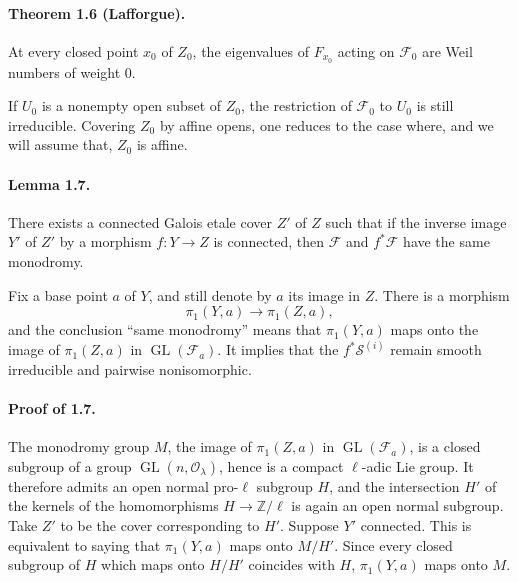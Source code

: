 \documentclass[10pt]{article}
\newcommand{\Z}{\mathbb{Z}}
\newcommand{\GL}{\operatorname{GL}}
\begin{document}
\paragraph{Theorem 1.6 (Lafforgue).}
At every closed point $x_0$ of $Z_0$, the eigenvalues of $F_{x_0}$ acting on $\mathcal F_0$ are Weil numbers of weight $0$.

If $U_0$ is a nonempty open subset of $Z_0$, the restriction of $\mathcal F_0$ to $U_0$ is still irreducible.
Covering $Z_0$ by affine opens, one reduces to the case where, and we will assume that, $Z_0$ is affine.

\paragraph{Lemma 1.7.}
There exists a connected Galois etale cover $Z'$ of $Z$ such that if the inverse image $Y'$ of $Z'$ by a morphism $f:Y\to Z$ is connected, then $\mathcal F$ and $f^*\mathcal F$ have the same monodromy.

Fix a base point $a$ of $Y$, and still denote by $a$ its image in $Z$.
There is a morphism
\[
 \pi_1(Y,a)\longrightarrow\pi_1(Z,a),
\]
and the conclusion ``same monodromy'' means that $\pi_1(Y,a)$ maps onto the image of $\pi_1(Z,a)$ in $\GL(\mathcal F_a)$.
It implies that the $f^*\mathcal S^{(i)}$ remain smooth irreducible and pairwise nonisomorphic.

\paragraph{Proof of 1.7.}
The monodromy group $M$, the image of $\pi_1(Z,a)$ in $\GL(\mathcal F_a)$, is a closed subgroup of a group $\GL(n,\mathcal O_\lambda)$, hence is a compact $\ell$-adic Lie group.
It therefore admits an open normal pro-$\ell$ subgroup $H$, and the intersection $H'$ of the kernels of the homomorphisms $H\to\Z/\ell$ is again an open normal subgroup.
Take $Z'$ to be the cover corresponding to $H'$.
Suppose $Y'$ connected.
This is equivalent to saying that $\pi_1(Y,a)$ maps onto $M/H'$.
Since every closed subgroup of $H$ which maps onto $H/H'$ coincides with $H$, $\pi_1(Y,a)$ maps onto $M$.
\end{document}
